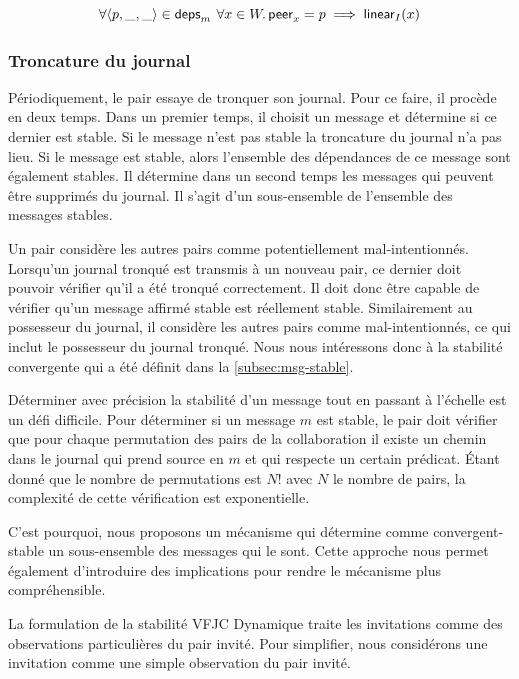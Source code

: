 \begin{equation*}
    \forall \tuple*{p, \_, \_} \in \trm{deps}_m \:\forall x \in W \qsep \trm{peer}_x = p \implies \trm{linear}_I(x)
\end{equation*}


\subsubsection{Troncature du journal}

Périodiquement, le pair essaye de tronquer son journal.
Pour ce faire, il procède en deux temps.
Dans un premier temps, il choisit un message et détermine si ce dernier est stable.
Si le message n'est pas stable la troncature du journal n'a pas lieu.
Si le message est stable, alors l'ensemble des dépendances de ce message sont également stables.
Il détermine dans un second temps les messages qui peuvent être supprimés du journal.
Il s'agit d'un sous-ensemble de l'ensemble des messages stables.

Un pair considère les autres pairs comme potentiellement mal-intentionnés.
Lorsqu'un journal tronqué est transmis à un nouveau pair, ce dernier doit pouvoir vérifier qu'il a été tronqué correctement.
Il doit donc être capable de vérifier qu'un message affirmé stable est réellement stable.
Similairement au possesseur du journal, il considère les autres pairs comme mal-intentionnés, ce qui inclut le possesseur du journal tronqué.
Nous nous intéressons donc à la stabilité convergente qui a été définit dans la \autoref{subsec:msg-stable}.

Déterminer avec précision la stabilité d'un message tout en passant à l'échelle est un défi difficile.
Pour déterminer si un message $m$ est stable, le pair doit vérifier que pour chaque permutation des pairs de la collaboration il existe un chemin dans le journal qui prend source en $m$ et qui respecte un certain prédicat.
Étant donné que le nombre de permutations est $N!$ avec $N$ le nombre de pairs, la complexité de cette vérification est exponentielle. %

C'est pourquoi, nous proposons un mécanisme qui détermine comme convergent-stable un sous-ensemble des messages qui le sont.
Cette approche nous permet également d'introduire des implications pour rendre le mécanisme plus compréhensible.

La formulation de la stabilité \acl{VFJC} Dynamique traite les invitations comme des observations particulières du pair invité.
Pour simplifier, nous considérons une invitation comme une simple observation du pair invité.

